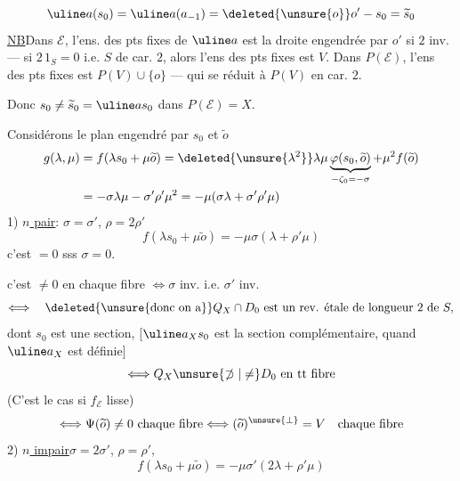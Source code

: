 \[
\uline a(s_0)=\uline a(a_{-1})
=\deleted{\unsure{o}}o'-s_0=\widetilde s_0
\]
\uline{NB}\quad Dans $\mathcal E$, l'ens. des pts fixes de $\uline a$ est
la droite engendrée par $o'$ si $2$ inv.
--- si $2\,1_S=0$ i.e. $S$ de car. $2$, alors l'ens des pts fixes est $V$.
Dans $P(\mathcal E)$, l'ens des pts fixes est $P(V)\cup\{o\}$
--- qui se réduit à $P(V)$ en car. $2$.

Donc $s_0\neq\widetilde s_0=\uline a s_0$ dans $P(\mathcal E)=X$.

Considérons le  plan engendré par $s_0$ et $\widetilde o$
\[
\begin{aligned}
g(\lambda,\mu)&=f(\lambda s_0+\mu\widetilde o)
=\deleted{\unsure{\lambda^2}}
\lambda\mu\underbrace{\varphi(s_0,\widetilde o)}_{-\zeta_0=-\sigma}
+\mu^2f(\widetilde o)\\
&=-\sigma\lambda\mu-\sigma'\rho'\mu^2
=-\mu(\sigma\lambda+\sigma'\rho'\mu)
\end{aligned}
\]
1) \uline{$n$ pair}: $\sigma=\sigma'$, $\rho=2\rho'$
\[
f(\lambda s_0+\mu\widetilde o)=-\mu\sigma(\lambda+\rho'\mu)
\]
c'est $=0$ sss $\sigma=0$.

c'est $\neq0$ en chaque fibre $\Longleftrightarrow\sigma$ inv. i.e. $\sigma'$ inv.
\[
\Longleftrightarrow\quad
\deleted{\unsure{\text{donc on a}}}
Q_X\cap D_0\ \text{est un rev. étale de longueur }2\text{ de }S,
\]
dont $s_0$ est une section,
[$\uline a_Xs_0$ est la section complémentaire,
quand $\uline a_X$ est définie]
\[
\Longleftrightarrow Q_X\unsure{\not\supset|\neq}D_0\ \text{en tt fibre}
\]
(C'est le cas si $f_{\mathcal E}$ lisse)
\[
\Longleftrightarrow\Psi(\widetilde o)\neq0\ \text{chaque fibre}
\Longleftrightarrow(\widetilde o)^{\unsure{\perp}}=V
\quad\text{chaque fibre}
\]
2) \uline{$n$ impair}\quad $\sigma=2\sigma'$, $\rho=\rho'$,
\[
f(\lambda s_0+\mu\widetilde o)=-\mu\sigma'(2\lambda+\rho'\mu)
\]


